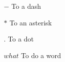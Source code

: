 \begin{itemize}
    \item[$-$] To a dash
    \item[$\ast$] To an asterisk
    \item[$.$] To a dot
    \item[$what$] To do a word
\end{itemize}
